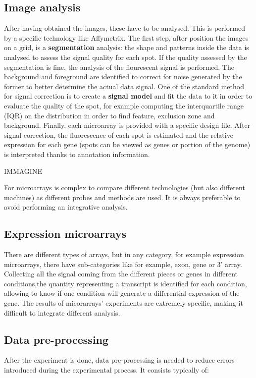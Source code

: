 	\subsection{Image analysis}
	After having obtained the images, these have to be analysed.
	This is performed by a specific technology like Affymetrix.
	The first step, after position the images on a grid, is a \textbf{segmentation} analysis: the shape and patterns inside the data is analysed to assess the signal quality for each spot.
	If the quality assessed by the segmentation is fine, the analysis of the flourescent signal is performed.
	The background and foreground are identified to correct for noise generated by the former to better determine the actual data signal.
	One of the standard method for signal correction is to create a \textbf{signal model} and fit the data to it in order to evaluate the quality of the spot, for example computing the interquartile range (IQR) on the distribution in order to find feature, exclusion zone and background.
	Finally, each microarray is provided with a specific design file.
	After signal correction, the fluorescence of each spot is estimated and the relative expression for each gene (spots can be viewed as genes or portion of the genome) is interpreted thanks to annotation information.

	\begin{center}
		IMMAGINE
	\end{center}

	For microarrays is complex to compare different technologies (but also different machines) as different probes and methods are used.
	It is always preferable to avoid performing an integrative analysis.

	\subsection{Expression microarrays}
	There are different types of arrays, but in any category, for example expression microarrays, there have sub-categories like for example, exon, gene or 3' array.
	Collecting all the signal coming from the different pieces or genes in different conditions,the quantity representing a transcript is identified for each condition, allowing to know if one condition will generate a differential expression of the gene.
	The results of micorarrays' experiments are extremely specific, making it difficult to integrate different analysis.

	\subsection{Data pre-processing}
	After the experiment is done, data pre-processing is needed to reduce errors introduced during the experimental process.
	It consists typically of:

